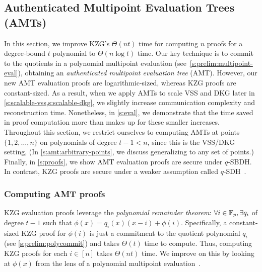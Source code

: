 \subsection{Authenticated Multipoint Evaluation Trees (AMTs)}
\label{s:amt}
In this section, we improve KZG's $\Theta(nt)$ time for computing $n$ proofs for a degree-bound $t$ polynomial to $\Theta(n\log{t})$ time.
Our key technique is to commit to the quotients in a polynomial multipoint evaluation (see~\cref{s:prelim:multipoint-eval}), obtaining an \textit{authenticated multipoint evaluation tree} (AMT).
However, our new AMT evaluation proofs are logarithmic-sized, whereas KZG proofs are constant-sized.
As a result, when we apply AMTs to scale VSS and DKG later in \cref{s:scalable-vss,s:scalable-dkg}, we slightly increase communication complexity and reconstruction time.
Nonetheless, in \cref{s:eval}, we demonstrate that the time saved in proof computation more than makes up for these smaller increases.
Throughout this section, we restrict ourselves to computing AMTs at points $\{1,2,\dots,n\}$ on polynomials of degree $t-1 < n$, since this is the VSS/DKG setting,
(In \cref{s:amt:arbitrary-points}, we discuss generalizing to any set of points.)
Finally, in \cref{s:proofs}, we show AMT evaluation proofs are secure under $q$-SBDH.
In contrast, KZG proofs are secure under a weaker assumption called $q$-SDH~\cite{BonehBoyen2008}.

\subsubsection{Computing AMT proofs}
\label{s:amt:computing-proofs}
KZG evaluation proofs leverage the \textit{polynomial remainder theorem}: $\forall i\in \mathbb{F}_p, \exists q_i$ of degree $t-1$ such that $\phi(x) = q_i(x)(x-i) + \phi(i)$.
Specifically, a constant-sized KZG proof for $\phi(i)$ is just a commitment to the quotient polynomial $q_i$ (see \cref{s:prelim:polycommit}) and takes $\Theta(t)$ time to compute.
Thus, computing KZG proofs for each $i\in[n]$ takes $\Theta(nt)$ time.
We improve on this by looking at $\phi(x)$ from the lens of a polynomial multipoint evaluation~\cite{moderncomputeralgebra-ch10}.

